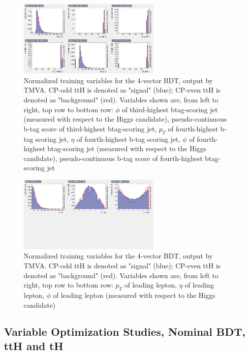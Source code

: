 \begin{figure}[htbp]
  \centering
  \includegraphics[width=0.62\textwidth]{figures/TMVABDTStudies/semilep-vbls4vec/semilep4vecvbls3.png}
  \caption{Normalized training variables for the 4-vector BDT, output by TMVA. CP-odd ttH is denoted as "signal" (blue); CP-even ttH is denoted as "background" (red). Variables shown are, from left to right, top row to bottom row: $\phi$ of third-highest btag-scoring jet (measured with respect to the Higgs candidate), pseudo-continuous b-tag score of third-highest btag-scoring jet, $p_{T}$ of fourth-highest b-tag scoring jet, $\eta$ of fourth-highest b-tag scoring jet, $\phi$ of fourth-highest btag-scoring jet (measured with respect to the Higgs candidate), pseudo-continuous b-tag score of fourth-highest btag-scoring jet}
  \label{fig:semilep4vecvbls3}
\end{figure}


\begin{figure}[htbp]
  \centering
  \includegraphics[width=0.62\textwidth]{figures/TMVABDTStudies/semilep-vbls4vec/semilep4vecvbls5.png}
  \caption{Normalized training variables for the 4-vector BDT, output by TMVA. CP-odd ttH is denoted as "signal" (blue); CP-even ttH is denoted as "background" (red). Variables shown are, from left to right, top row to bottom row: $p_{T}$ of leading lepton, $\eta$ of leading lepton, $\phi$ of leading lepton (measured with respect to the Higgs candidate)}
  \label{fig:semilep4vecvbls5}
\end{figure}
  
  
\subsection{Variable Optimization Studies, Nominal BDT, ttH and tH}

